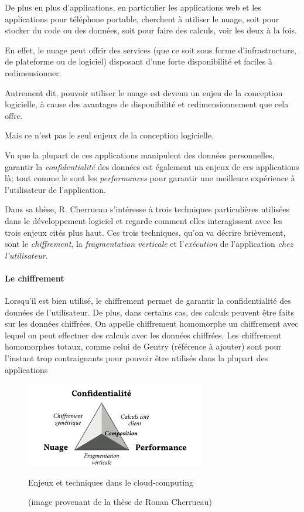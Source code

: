 De plus en plus d'applications, en particulier
les applications web et les applications pour téléphone portable,
cherchent à utiliser le nuage, soit pour stocker du code ou des données, 
soit pour faire des calculs,
voir les deux à la fois.

En effet, le nuage peut offrir des services (que ce soit sous forme d'infrastructure,
de plateforme ou de logiciel) disposant d'une forte disponibilité et faciles à redimensionner.

Autrement dit, pouvoir utiliser le nuage est devenu un enjeu de la conception logicielle,
à cause des avantages de disponibilité et redimensionnement que cela offre.

Mais ce n'est pas le seul enjeux de la conception logicielle.

Vu que la plupart de ces applications manipulent des données personnelles, 
garantir la \emph{confidentialité} des données est également un enjeux de 
ces applications là; tout comme le sont les \emph{performances} pour garantir
une meilleure expérience à l'utilisateur de l'application.

Dans sa thèse, R. Cherrueau s'intéresse à trois techniques particulières
utilisées dans le développement logiciel et regarde comment elles interagissent
avec les trois enjeux cités plus haut.
Ces trois techniques, qu'on va décrire brièvement, sont
	le \emph{chiffrement},
	la \emph{fragmentation verticale} et
	l'\emph{exécution} de l'application \emph{chez l'utilisateur}.

\paragraph{Le chiffrement}
Lorsqu'il est bien utilisé, le chiffrement permet de garantir la confidentialité
des données de l'utilisateur.
De plus, dans certains cas, des calculs peuvent être faits sur les données chiffrées.
On appelle chiffrement homomorphe un chiffrement avec lequel on peut effectuer des calculs
avec les données chiffrées. Les chiffrement homomorphes totaux, comme celui de
Gentry (référence à ajouter) sont pour l'instant trop contraignants pour pouvoir être utilisés
dans la plupart des applications


\begin{figure}
	\begin{center}
		\includegraphics[width=0.7\textwidth]{snps.png}
		\caption{Enjeux et techniques dans le cloud-computing}
		\caption*{(image provenant de la thèse de Ronan Cherrueau)}
		\label{enjeux}
	\end{center}
\end{figure}